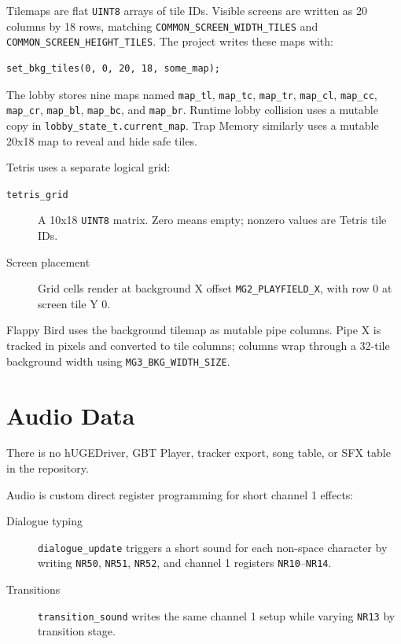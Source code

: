 Tilemaps are flat \texttt{UINT8} arrays of tile IDs. Visible screens are written as 20 columns by 18 rows, matching \texttt{COMMON\_SCREEN\_WIDTH\_TILES} and \texttt{COMMON\_SCREEN\_HEIGHT\_TILES}. The project writes these maps with:

\begin{lstlisting}[caption={Tilemap load pattern}]
set_bkg_tiles(0, 0, 20, 18, some_map);
\end{lstlisting}

The lobby stores nine maps named \texttt{map\_tl}, \texttt{map\_tc}, \texttt{map\_tr}, \texttt{map\_cl}, \texttt{map\_cc}, \texttt{map\_cr}, \texttt{map\_bl}, \texttt{map\_bc}, and \texttt{map\_br}. Runtime lobby collision uses a mutable copy in \texttt{lobby\_state\_t.current\_map}. Trap Memory similarly uses a mutable 20x18 map to reveal and hide safe tiles.

Tetris uses a separate logical grid:

\begin{description}
  \item[\texttt{tetris\_grid}] A 10x18 \texttt{UINT8} matrix. Zero means empty; nonzero values are Tetris tile IDs.
  \item[Screen placement] Grid cells render at background X offset \texttt{MG2\_PLAYFIELD\_X}, with row 0 at screen tile Y 0.
\end{description}

Flappy Bird uses the background tilemap as mutable pipe columns. Pipe X is tracked in pixels and converted to tile columns; columns wrap through a 32-tile background width using \texttt{MG3\_BKG\_WIDTH\_SIZE}.

\section{Audio Data}

There is no hUGEDriver, GBT Player, tracker export, song table, or SFX table in the repository.

Audio is custom direct register programming for short channel 1 effects:

\begin{description}
  \item[Dialogue typing] \texttt{dialogue\_update} triggers a short sound for each non-space character by writing \texttt{NR50}, \texttt{NR51}, \texttt{NR52}, and channel 1 registers \texttt{NR10}--\texttt{NR14}.
  \item[Transitions] \texttt{transition\_sound} writes the same channel 1 setup while varying \texttt{NR13} by transition stage.
\end{description}

